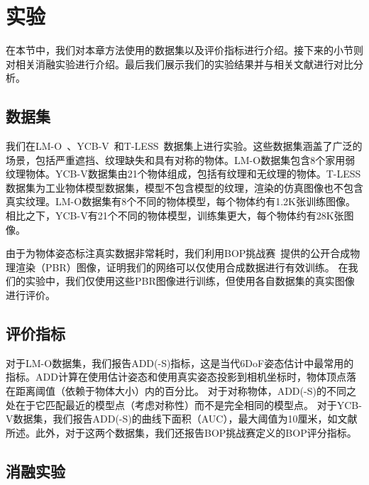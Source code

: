 \section{实验}\label{sec:exp}

在本节中，我们对本章方法使用的数据集以及评价指标进行介绍。接下来的小节则对相关消融实验进行介绍。最后我们展示我们的实验结果并与相关文献进行对比分析。

\subsection{数据集}
我们在LM-O~\cite{Brachmann2016UncertaintyDriven6P}、YCB-V~\cite{xiang2018posecnn}和T-LESS~\cite{hodan2017t}数据集上进行实验。这些数据集涵盖了广泛的场景，包括严重遮挡、纹理缺失和具有对称的物体。LM-O数据集包含8个家用弱纹理物体。YCB-V数据集由21个物体组成，包括有纹理和无纹理的物体。T-LESS数据集为工业物体模型数据集，模型不包含模型的纹理，渲染的仿真图像也不包含真实纹理。LM-O数据集有8个不同的物体模型，每个物体约有1.2K张训练图像。相比之下，YCB-V有21个不同的物体模型，训练集更大，每个物体约有28K张图像。

由于为物体姿态标注真实数据非常耗时，我们利用BOP挑战赛~\cite{Sundermeyer2023BOPC2}提供的公开合成物理渲染（PBR）图像，证明我们的网络可以仅使用合成数据进行有效训练。
在我们的实验中，我们仅使用这些PBR图像进行训练，但使用各自数据集的真实图像进行评价。

\subsection{评价指标}

对于LM-O数据集，我们报告ADD(-S)指标，这是当代6DoF姿态估计中最常用的指标。ADD计算在使用估计姿态和使用真实姿态投影到相机坐标时，物体顶点落在距离阈值（依赖于物体大小）内的百分比。
对于对称物体，ADD(-S)的不同之处在于它匹配最近的模型点（考虑对称性）而不是完全相同的模型点。
对于YCB-V数据集，我们报告ADD(-S)的曲线下面积（AUC），最大阈值为10厘米，如文献\cite{xiang2018posecnn}所述。此外，对于这两个数据集，我们还报告BOP挑战赛定义的BOP评分指标\cite{Sundermeyer2023BOPC2}。


\subsection{消融实验}
% 
% 
% 


% 
% 
% 

